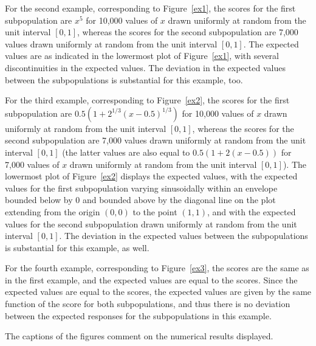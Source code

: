 \documentclass{article}
\begin{document}
For the second example, corresponding to Figure~\ref{ex1},
the scores for the first subpopulation
are $x^5$ for 10,000 values of $x$
drawn uniformly at random from the unit interval $[0, 1]$,
whereas the scores for the second subpopulation are 7,000 values
drawn uniformly at random from the unit interval $[0, 1]$.
The expected values are as indicated in the lowermost plot of Figure~\ref{ex1},
with several discontinuities in the expected values.
The deviation in the expected values between the subpopulations
is substantial for this example, too.

For the third example, corresponding to Figure~\ref{ex2},
the scores for the first subpopulation
are $0.5 (1 + 2^{1/3} (x - 0.5)^{1/3})$ for 10,000 values of $x$
drawn uniformly at random from the unit interval $[0, 1]$,
whereas the scores for the second subpopulation are 7,000 values
drawn uniformly at random from the unit interval $[0, 1]$
(the latter values are also equal to $0.5 (1 + 2 (x - 0.5))$
for 7,000 values of $x$ drawn uniformly at random from the unit interval
$[0, 1]$).
The lowermost plot of Figure~\ref{ex2} displays the expected values,
with the expected values for the first subpopulation varying sinusoidally
within an envelope bounded below by 0 and bounded above by the diagonal line
on the plot extending from the origin $(0, 0)$ to the point $(1, 1)$,
and with the expected values for the second subpopulation drawn uniformly
at random from the unit interval $[0, 1]$.
The deviation in the expected values between the subpopulations
is substantial for this example, as well.

For the fourth example, corresponding to Figure~\ref{ex3},
the scores are the same as in the first example,
and the expected values are equal to the scores.
Since the expected values are equal to the scores, the expected values
are given by the same function of the score for both subpopulations,
and thus there is no deviation between the expected responses
for the subpopulations in this example.

The captions of the figures comment on the numerical results displayed.
\end{document}
